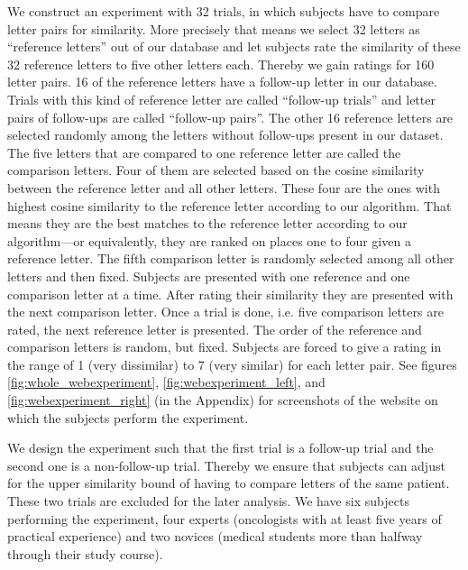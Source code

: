 We construct an experiment with 32 trials, in which subjects have to compare letter pairs for similarity. More precisely that means we select 32 letters as ``reference letters'' out of our database and let subjects rate the similarity of these 32 reference letters to five other letters each. Thereby we gain ratings for 160 letter pairs. 16 of the reference letters have a follow-up letter in our database. Trials with this kind of reference letter are called ``follow-up trials'' and letter pairs of follow-ups are called ``follow-up pairs''. The other 16 reference letters are selected randomly among the letters without follow-ups present in our dataset. The five letters that are compared to one reference letter are called the comparison letters. Four of them are selected based on the cosine similarity between the reference letter and all other letters. These four are the ones with highest cosine similarity to the reference letter according to our algorithm. That means they are the best matches to the reference letter according to our algorithm---or equivalently, they are ranked on places one to four given a reference letter. The fifth comparison letter is randomly selected among all other letters and then fixed. Subjects are presented with one reference and one comparison letter at a time. After rating their similarity they are presented with the next comparison letter. Once a trial is done, i.e. five comparison letters are rated, the next reference letter is presented. The order of the reference and comparison letters is random, but fixed. Subjects are forced to give a rating in the range of 1 (very dissimilar) to 7 (very similar) for each letter pair. See figures \ref{fig:whole_webexperiment}, \ref{fig:webexperiment_left}, and \ref{fig:webexperiment_right} (in the Appendix) for screenshots of the website on which the subjects perform the experiment.

We design the experiment such that the first trial is a follow-up trial and the second one is a non-follow-up trial. Thereby we ensure that subjects can adjust for the upper similarity bound of having to compare letters of the same patient. These two trials are excluded for the later analysis. We have six subjects performing the experiment, four experts (oncologists with at least five years of practical experience) and two novices (medical students more than halfway through their study course).





